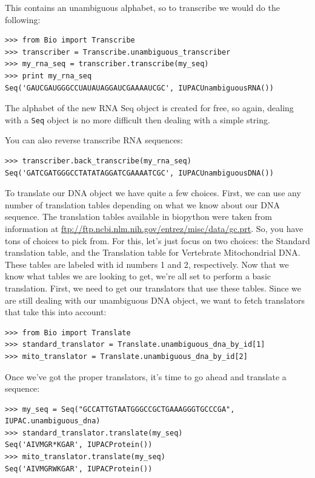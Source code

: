 \documentclass{report}
\begin{document}
This contains an unambiguous alphabet, so to transcribe we would do the following:

\begin{verbatim}
>>> from Bio import Transcribe
>>> transcriber = Transcribe.unambiguous_transcriber
>>> my_rna_seq = transcriber.transcribe(my_seq)
>>> print my_rna_seq
Seq('GAUCGAUGGGCCUAUAUAGGAUCGAAAAUCGC', IUPACUnambiguousRNA())
\end{verbatim}

The alphabet of the new RNA Seq object is created for free, so again, dealing with a \verb|Seq| object is no more difficult then dealing with a simple string.

You can also reverse transcribe RNA sequences:

\begin{verbatim}
>>> transcriber.back_transcribe(my_rna_seq)
Seq('GATCGATGGGCCTATATAGGATCGAAAATCGC', IUPACUnambiguousDNA())
\end{verbatim}

To translate our DNA object we have quite a few choices. First, we can use any number of translation tables depending on what we know about our DNA sequence. The translation tables available in biopython were taken from information at \url{ftp://ftp.ncbi.nlm.nih.gov/entrez/misc/data/gc.prt}. So, you have tons of choices to pick from. For this, let's just focus on two choices: the Standard translation table, and the Translation table for Vertebrate Mitochondrial DNA. These tables are labeled with id numbers 1 and 2, respectively. Now that we know what tables we are looking to get, we're all set to perform a basic translation. First, we need to get our translators that use these tables. Since we are still dealing with our unambiguous DNA object, we want to fetch translators that take this into account:

\begin{verbatim}
>>> from Bio import Translate
>>> standard_translator = Translate.unambiguous_dna_by_id[1]
>>> mito_translator = Translate.unambiguous_dna_by_id[2]
\end{verbatim}

Once we've got the proper translators, it's time to go ahead and translate a sequence:

\begin{verbatim}
>>> my_seq = Seq("GCCATTGTAATGGGCCGCTGAAAGGGTGCCCGA", IUPAC.unambiguous_dna)
>>> standard_translator.translate(my_seq)
Seq('AIVMGR*KGAR', IUPACProtein())
>>> mito_translator.translate(my_seq)
Seq('AIVMGRWKGAR', IUPACProtein())
\end{verbatim}
\end{document}
